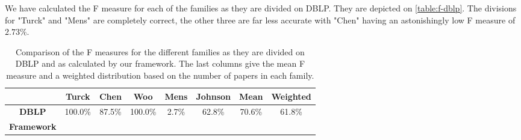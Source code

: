 We have calculated the F measure for each of the families as they are divided on DBLP. They are depicted on \ref{table:f-dblp}. The divisions for "Turck" and "Mens" are completely correct, the other three are far less accurate with "Chen" having an astonishingly low F measure of $2.73\%$.

\begin{table}
	\centering
		\begin{tabular}{|c|c|c|c|c|c|c|c|}
			\hline
			& \bfseries{Turck} & \bfseries{Chen} & \bfseries{Woo} & \bfseries{Mens} & \bfseries{Johnson} & \bfseries{Mean} & \bfseries{Weighted} \\
			\hline
			\bfseries{DBLP} & 100.0\% & 87.5\% & 100.0\% & 2.7\% & 62.8\% & 70.6\% & 61.8\%\\
			\hline
			\bfseries{Framework} & & & & & & \\
		\end{tabular}
	\caption{Comparison of the F measures for the different families as they are divided on DBLP and as calculated by our framework. The last columns give the mean F measure and a weighted distribution based on the number of papers in each family.}
	\label{tab:f-dblp}
\end{table}